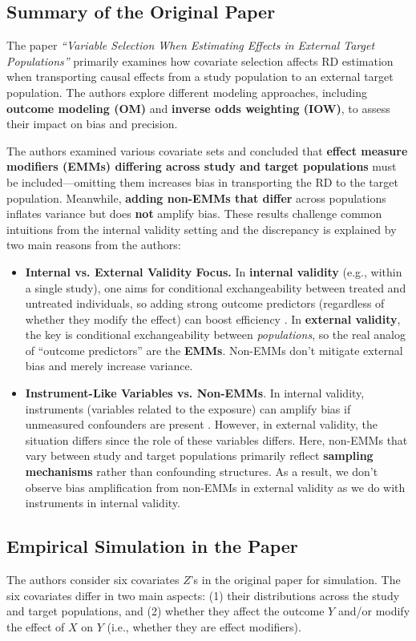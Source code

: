 \documentclass[12pt,oneside]{amsart}
\theoremstyle{definition}
\theoremstyle{remark}
\numberwithin{equation}{section}
\begin{document}
\subsection{Summary of the Original Paper}
The paper \textit{``Variable Selection When Estimating Effects in External Target Populations''} primarily examines how covariate selection affects RD estimation when transporting causal effects from a study population to an external target population. The authors explore different modeling approaches, including \textbf{outcome modeling (OM)} and \textbf{inverse odds weighting (IOW)}, to assess their impact on bias and precision.

The authors examined various covariate sets and concluded that \textbf{effect measure modifiers (EMMs) differing across study and target populations} must be included—omitting them increases bias in transporting the RD to the target population. Meanwhile, \textbf{adding non-EMMs that differ} across populations inflates variance but does \textbf{not} amplify bias. These results challenge common intuitions from the internal validity setting and the discrepancy is explained by two main reasons from the authors: 
\begin{itemize}
    \item \textbf{Internal vs. External Validity Focus.} In \textbf{internal validity} (e.g., within a single study), one aims for conditional exchangeability between treated and untreated individuals, so adding strong outcome predictors (regardless of whether they modify the effect) can boost efficiency \citep{internal}. In \textbf{external validity}, the key is conditional exchangeability between \textit{populations}, so the real analog of “outcome predictors” are the \textbf{EMMs}. Non-EMMs don’t mitigate external bias and merely increase variance.
    \item \textbf{Instrument-Like Variables vs. Non-EMMs}. In internal validity, instruments (variables related to the exposure) can amplify bias if unmeasured confounders are present \citep{instrument}. However, in external validity, the situation differs since the role of these variables differs. Here, non-EMMs that vary between study and target populations primarily reflect \textbf{sampling mechanisms} rather than confounding structures. As a result, we don’t observe bias amplification from non-EMMs in external validity as we do with instruments in internal validity.
\end{itemize}

\subsection{Empirical Simulation in the Paper}
The authors consider six covariates $Z$'s in the original paper for simulation. The six covariates differ in two main aspects: (1) their distributions across the study and target populations, and (2) whether they affect the outcome $Y$ and/or modify the effect of $X$ on $Y$ (i.e., whether they are effect modifiers). 
\end{document}
